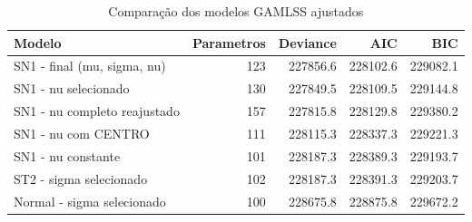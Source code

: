 \begin{table}

\caption{\label{tab:tab:modelos_gamlss}Comparação dos modelos GAMLSS ajustados}
\centering
\begin{tabular}[t]{lrrrr}
\toprule
Modelo & Parametros & Deviance & AIC & BIC\\
\midrule
SN1 - final (mu, sigma, nu) & 123 & 227856.6 & 228102.6 & 229082.1\\
SN1 - nu selecionado & 130 & 227849.5 & 228109.5 & 229144.8\\
SN1 - nu completo reajustado & 157 & 227815.8 & 228129.8 & 229380.2\\
SN1 - nu com CENTRO & 111 & 228115.3 & 228337.3 & 229221.3\\
SN1 - nu constante & 101 & 228187.3 & 228389.3 & 229193.7\\
\addlinespace
ST2 - sigma selecionado & 102 & 228187.3 & 228391.3 & 229203.7\\
Normal - sigma selecionado & 100 & 228675.8 & 228875.8 & 229672.2\\
\bottomrule
\end{tabular}
\end{table}
